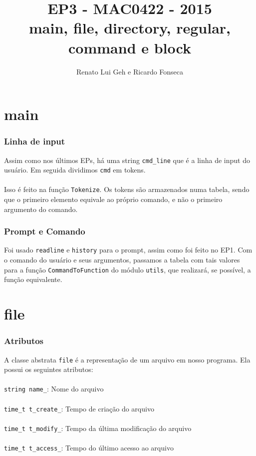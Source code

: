 \documentclass{beamer}
\title[EP3 - MAC0422]{EP3 - MAC0422 - 2015 \\
                      main, file, directory, regular, command e block} %
\author{Renato Lui Geh e Ricardo Fonseca}
\date{}
\begin{document}
\begin{frame}
  \titlepage %
\end{frame}



\section{main} %

\begin{frame}
  \frametitle{Linha de input}
  Assim como nos últimos EPs, há uma string \texttt{cmd\_line} que é a linha de input do usuário. Em seguida dividimos \texttt{cmd} em tokens. \\~\\
  Isso é feito na função \texttt{Tokenize}. Os tokens são armazenados numa tabela, sendo que o primeiro elemento equivale ao próprio comando, e não o primeiro argumento do comando.
\end{frame}

\begin{frame}
  \frametitle{Prompt e Comando}
  Foi usado \texttt{readline} e \texttt{history} para o prompt, assim como foi feito no EP1.
  Com o comando do usuário e seus argumentos, passamos a tabela com tais valores para a função
  \texttt{CommandToFunction} do módulo \texttt{utils}, que realizará, se possível, a função equivalente. 
\end{frame}


\section{file}

\begin{frame}
  \frametitle{Atributos}
  A classe abstrata \texttt{file} é a representação de um arquivo em nosso programa. Ela possui os seguintes atributos:\\~\\
       \texttt{string name\_}: Nome do arquivo \\~\\
  \texttt{time\_t t\_create\_}: Tempo de criação do arquivo \\~\\
  \texttt{time\_t t\_modify\_}: Tempo da última modificação do arquivo \\~\\
  \texttt{time\_t t\_access\_}: Tempo do último acesso ao arquivo
  
  
\end{frame}
\end{document}
